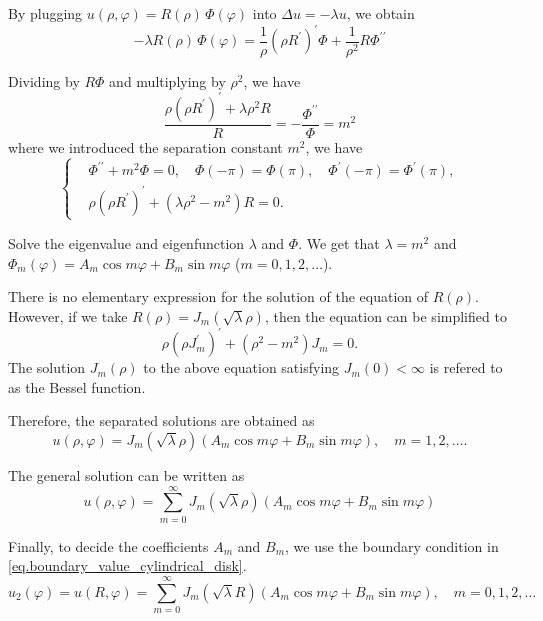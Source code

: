 By plugging $u(\rho, \varphi)=R(\rho)\, \Phi(\varphi)$ into $\Delta u = -\lambda u$, we obtain
$$
-\lambda R(\rho)\, \Phi(\varphi)=\frac{1}{\rho}(\rho R^{\prime})^{\prime} \Phi+\frac{1}{\rho^2} R \Phi^{\prime \prime}
$$

Dividing by $R \Phi$ and multiplying by $\rho^2$, we have
$$
\frac{\rho(\rho R^{\prime})^{\prime} + \lambda \rho^2 R}{R} = - \frac{\Phi^{\prime \prime}}{\Phi} = m^2
$$
where we introduced the separation constant $m^2$, we have
\begin{equation}\label{eq.helmholtz_separation_var}
\left\{\begin{aligned}
    &\Phi^{\prime \prime}+m^2 \Phi=0, \quad \Phi(-\pi)=\Phi(\pi), \quad \Phi^{\prime}(-\pi)=\Phi^{\prime}(\pi), 
    \\
    &\rho(\rho R^{\prime})^{\prime} + (\lambda \rho^2 - m^2) R = 0.
\end{aligned}
\right.
\end{equation}

Solve the eigenvalue and eigenfunction $\lambda$ and $\Phi$. We get that $\lambda=m^2$ and $\Phi_m(\varphi)=A_m \cos m \varphi+B_m \sin m \varphi$ ($m=0,1,2, \ldots$). 

There is no elementary expression for the solution of the equation of $R(\rho)$. However, if we take $R(\rho) = J_m(\sqrt{\lambda}\rho)$, then the equation can be simplified to 
\begin{equation}
    \rho(\rho J_m^{\prime})^{\prime} + (\rho^2 - m^2) J_m = 0.
\end{equation}
The solution $J_m(\rho)$ to the above equation satisfying $J_m(0) < \infty$ is refered to as the Bessel function.

Therefore, the separated solutions are obtained as
\begin{equation}
u(\rho, \varphi)=J_m(\sqrt{\lambda}\rho)\left(A_m \cos m \varphi+B_m \sin m \varphi\right),\quad m=1,2, \ldots.
\end{equation}

The general solution can be written as
\begin{equation}\label{eq.helmholtz_general_sol}
    u(\rho, \varphi)=\sum_{m = 0}^\infty J_m(\sqrt{\lambda}\rho)\left(A_m \cos m \varphi+B_m \sin m \varphi\right)
\end{equation}

Finally, to decide the coefficients $A_m$ and $B_m$, we use the boundary condition in \eqref{eq.boundary_value_cylindrical_disk}.
\begin{equation}
    u_2(\varphi) = u(R, \varphi)=\sum_{m = 0}^\infty J_m(\sqrt{\lambda}R)\left(A_m \cos m \varphi+B_m \sin m \varphi\right), \quad m=0,1,2, \ldots
\end{equation}

